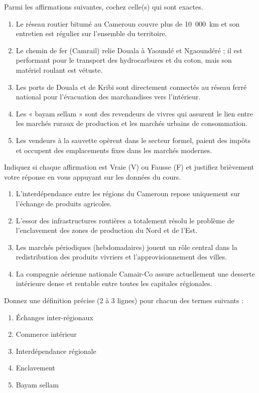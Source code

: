 \documentclass[11pt]{article}
\newcommand{\cle}[1]{{\popxbold\color{popdark}#1}}
\begin{document}
\begin{exercice}
Parmi les affirmations suivantes, cochez celle(s) qui sont exactes.
\begin{enumerate}
    \item Le réseau routier bitumé au Cameroun couvre plus de 10~000~km et son entretien est régulier sur l'ensemble du territoire.
    \item Le chemin de fer (Camrail) relie Douala à Yaoundé et Ngaoundéré ; il est performant pour le transport des hydrocarbures et du coton, mais son matériel roulant est vétuste.
    \item Les ports de Douala et de Kribi sont directement connectés au réseau ferré national pour l'évacuation des marchandises vers l'intérieur.
    \item Les « \cle{bayam sellam} » sont des revendeurs de vivres qui assurent le lien entre les marchés ruraux de production et les marchés urbains de consommation.
    \item Les vendeurs à la sauvette opèrent dans le secteur formel, paient des impôts et occupent des emplacements fixes dans les marchés modernes.
\end{enumerate}
\end{exercice}

\begin{exercice}
Indiquez si chaque affirmation est Vraie (V) ou Fausse (F) et justifiez brièvement votre réponse en vous appuyant sur les données du cours.
\begin{enumerate}
    \item L'interdépendance entre les régions du Cameroun repose uniquement sur l'échange de produits agricoles.
    \item L'essor des infrastructures routières a totalement résolu le problème de l'enclavement des zones de production du Nord et de l'Est.
    \item Les marchés périodiques (hebdomadaires) jouent un rôle central dans la redistribution des produits vivriers et l'approvisionnement des villes.
    \item La compagnie aérienne nationale Camair-Co assure actuellement une desserte intérieure dense et rentable entre toutes les capitales régionales.
\end{enumerate}
\end{exercice}

\begin{exercice}
Donnez une définition précise (2 à 3 lignes) pour chacun des termes suivants :
\begin{enumerate}
    \item Échanges inter-régionaux
    \item Commerce intérieur
    \item Interdépendance régionale
    \item Enclavement
    \item Bayam sellam
\end{enumerate}
\end{exercice}
\end{document}
